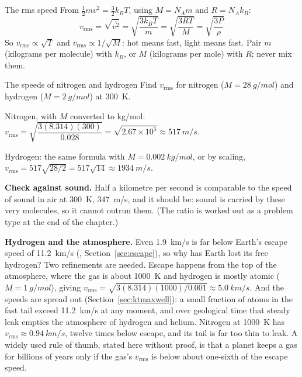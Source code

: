 \begin{keybox}{The rms speed}
From $\tfrac12 m\overline{v^2} = \tfrac32k_BT$, using $M = N_A m$ and $R = N_A k_B$:
\[
\boxed{\;v_{\text{rms}} = \sqrt{\overline{v^2}} = \sqrt{\frac{3k_BT}{m}} = \sqrt{\frac{3RT}{M}}
= \sqrt{\frac{3P}{\rho}}\;}
\]
So $v_{\text{rms}} \propto \sqrt{T}$ and $v_{\text{rms}}\propto 1/\sqrt{M}$: hot means fast, light means
fast. Pair $m$ (kilograms per molecule) with $k_B$, or $M$ (kilograms per mole) with $R$; never mix them.
\end{keybox}

\begin{exbox}{The speeds of nitrogen and hydrogen}\label{ex:ktrms}
Find $v_{\text{rms}}$ for nitrogen ($M = \SI{28}{g/mol}$) and hydrogen ($M=\SI{2}{g/mol}$) at
\SI{300}{K}.

 Nitrogen, with $M$ converted to \si{kg/mol}:
$v_{\text{rms}} = \sqrt{\dfrac{3(8.314)(300)}{0.028}} = \sqrt{2.67\times10^5} \approx \SI{517}{m/s}$.

 Hydrogen: the same formula with $M=\SI{0.002}{kg/mol}$, or by scaling,
$v_{\text{rms}} = 517\sqrt{28/2} = 517\sqrt{14} \approx \SI{1934}{m/s}$.

 \textbf{Check against sound.} Half a kilometre per second is comparable to the speed of sound in
air at \SI{300}{K}, \SI{347}{m/s}, and it should be: sound is carried by these very molecules, so it
cannot outrun them. (The ratio is worked out as a problem type at the end of the chapter.)

 \textbf{Hydrogen and the atmosphere.} Even \SI{1.9}{km/s} is far below Earth's escape speed of
\SI{11.2}{km/s} (, Section~\ref{sec:escape}), so why has Earth lost its free
hydrogen? Two refinements are needed. Escape happens from the top of the atmosphere, where the gas is
about \SI{1000}{K} and hydrogen is mostly atomic ($M=\SI{1}{g/mol}$), giving
$v_{\text{rms}}=\sqrt{3(8.314)(1000)/0.001}\approx\SI{5.0}{km/s}$. And the speeds are spread out
(Section~\ref{sec:ktmaxwell}): a small fraction of atoms in the fast tail exceed \SI{11.2}{km/s} at any
moment, and over geological time that steady leak empties the atmosphere of hydrogen and helium. Nitrogen
at \SI{1000}{K} has $v_{\text{rms}}\approx\SI{0.94}{km/s}$, twelve times below escape, and its tail is far
too thin to leak. A widely used rule of thumb, stated here without proof, is that a planet keeps a gas
for billions of years only if the gas's $v_{\text{rms}}$ is below about one-sixth of the escape speed.
\end{exbox}

